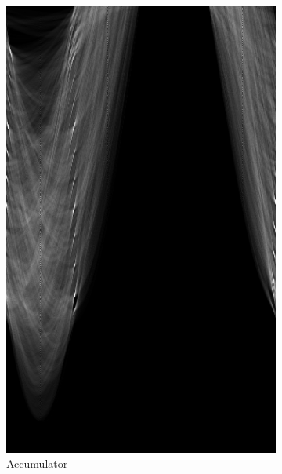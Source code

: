 \begin{figure}[]
\begin{subfigure}{0.3\textwidth}
        \includegraphics[width=\linewidth] {../../packages/js-benchmarks/img/seq.png}
        \caption{Accumulator}\label{fig:sht_example:b}
    \end{subfigure}\hfill
    \begin{subfigure}{0.3\textwidth}

\end{subfigure}
\end{figure}
